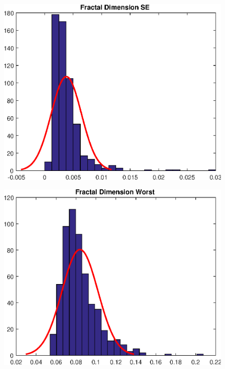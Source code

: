\documentclass[11pt,a4paper]{article}
\numberwithin{equation}{section}
\begin{document}
\begin{itemize}
\begin{figure}[H]
\centering
\begin{minipage}{.5\textwidth}
  \centering
  \includegraphics[width=\linewidth]{./img/fractal_dimension_se}
  \label{fig:test1}
\end{minipage}%
\begin{minipage}{.5\textwidth}
  \centering
  \includegraphics[width=\linewidth]{./img/fractal_dimension_worst}
  \label{fig:test2}
\end{minipage}
\end{figure}
\end{itemize}
\end{document}
